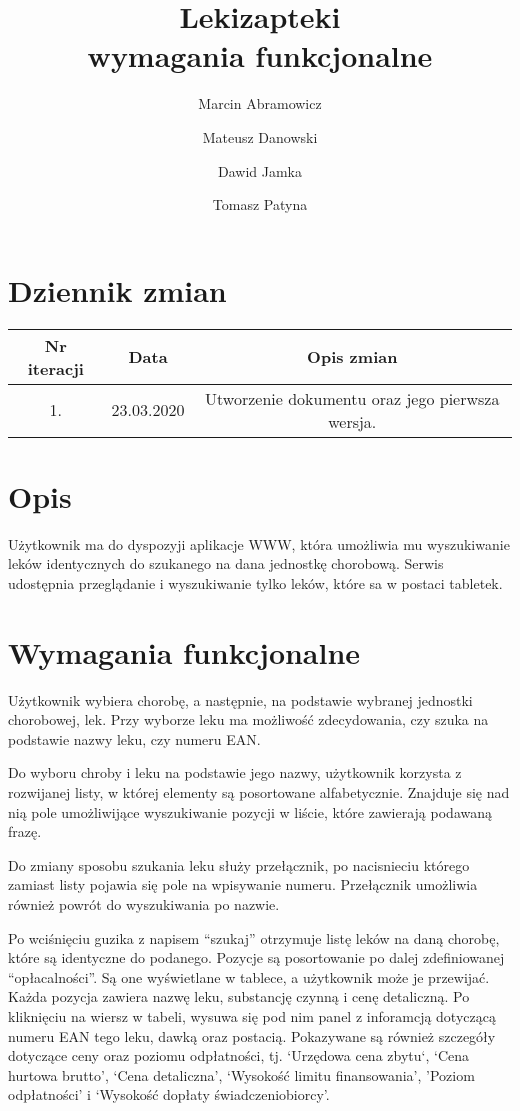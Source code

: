 \documentclass{article}
\title{
Lekizapteki\\
\large wymagania funkcjonalne}
\author{Marcin Abramowicz \and Mateusz Danowski \and Dawid Jamka \and Tomasz Patyna}
\begin{document}
  \maketitle

  \section{Dziennik zmian}
  \begin{tabular}{|c|c|c|}
    Nr iteracji & Data & Opis zmian \\
    \hline
    1. & 23.03.2020 & Utworzenie dokumentu oraz jego pierwsza wersja. \\
  \end{tabular}

  \section{Opis}
  Użytkownik ma do dyspozyji aplikacje WWW, która umożliwia mu wyszukiwanie leków identycznych do szukanego na dana jednostkę chorobową.
  Serwis udostępnia przeglądanie i wyszukiwanie tylko leków, które sa w postaci tabletek.

  \section{Wymagania funkcjonalne}
  Użytkownik wybiera chorobę, a następnie, na podstawie wybranej jednostki chorobowej, lek.
  Przy wyborze leku ma możliwość zdecydowania, czy szuka na podstawie nazwy leku, czy numeru EAN.

  Do wyboru chroby i leku na podstawie jego nazwy, użytkownik korzysta z rozwijanej listy, w której elementy są posortowane alfabetycznie.
  Znajduje się nad nią pole umożliwijące wyszukiwanie pozycji w liście, które zawierają podawaną frazę.

  Do zmiany sposobu szukania leku służy przełącznik, po nacisnieciu którego zamiast listy pojawia się pole na wpisywanie numeru.
  Przełącznik umożliwia również powrót do wyszukiwania po nazwie.

  Po wciśnięciu guzika z napisem ``szukaj'' otrzymuje listę leków na daną chorobę, które są identyczne do podanego.
  Pozycje są posortowanie po dalej zdefiniowanej ``opłacalności''.
  Są one wyświetlane w tablece, a użytkownik może je przewijać.
  Każda pozycja zawiera nazwę leku, substancję czynną i cenę detaliczną.
  Po kliknięciu na wiersz w tabeli, wysuwa się pod nim panel z inforamcją dotyczącą numeru EAN tego leku, dawką oraz postacią.
  Pokazywane są również szczegóły dotyczące ceny oraz poziomu odpłatności, tj.
  `Urzędowa cena zbytu`,
  `Cena hurtowa brutto',
  `Cena detaliczna',
  `Wysokość limitu finansowania',
	'Poziom odpłatności' i
  `Wysokość dopłaty świadczeniobiorcy'.
\end{document}
